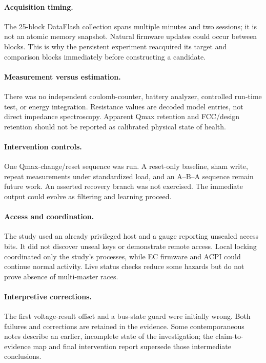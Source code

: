 \documentclass[11pt,a4paper]{article}
\begin{document}
\paragraph{Acquisition timing.} The 25-block DataFlash collection spans multiple minutes and two sessions; it is not an atomic memory snapshot. Natural firmware updates could occur between blocks. This is why the persistent experiment reacquired its target and comparison blocks immediately before constructing a candidate.

\paragraph{Measurement versus estimation.} There was no independent coulomb-counter, battery analyzer, controlled run-time test, or energy integration. Resistance values are decoded model entries, not direct impedance spectroscopy. Apparent Qmax retention and FCC/design retention should not be reported as calibrated physical state of health.

\paragraph{Intervention controls.} One Qmax-change/reset sequence was run. A reset-only baseline, sham write, repeat measurements under standardized load, and an A--B--A sequence remain future work. An asserted recovery branch was not exercised. The immediate output could evolve as filtering and learning proceed.

\paragraph{Access and coordination.} The study used an already privileged host and a gauge reporting unsealed access bits. It did not discover unseal keys or demonstrate remote access. Local locking coordinated only the study's processes, while EC firmware and ACPI could continue normal activity. Live status checks reduce some hazards but do not prove absence of multi-master races.

\paragraph{Interpretive corrections.} The first voltage-result offset and a bus-state guard were initially wrong. Both failures and corrections are retained in the evidence. Some contemporaneous notes describe an earlier, incomplete state of the investigation; the claim-to-evidence map and final intervention report supersede those intermediate conclusions.
\end{document}
